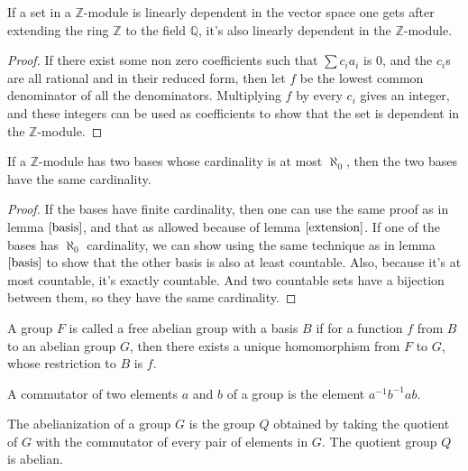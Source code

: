 \begin{lem}\label{extension}
If a set in a $\mathbb{Z}$-module is linearly dependent in the vector space one gets after extending the ring $\mathbb{Z}$ to the field $\mathbb{Q}$, it's also linearly dependent in the $\mathbb{Z}$-module.
\end{lem}

\begin{proof}
If there exist some non zero coefficients such that $\sum c_ia_i$ is $0$, and the $c_i$s are all rational and in their reduced form, then let $f$ be the lowest common denominator of all the denominators. Multiplying $f$ by every $c_i$ gives an integer, and these integers can be used as coefficients to show that the set is dependent in the $\mathbb{Z}$-module.
\end{proof}

\begin{lem}
If a $\mathbb{Z}$-module has two bases whose cardinality is at most $\aleph_0$, then the two bases have the same cardinality.
\end{lem}

\begin{proof}
If the bases have finite cardinality, then one can use the same proof as in lemma $\autoref{basis}$, and that as allowed because of lemma $\autoref{extension}$. If one of the bases has $\aleph_0$ cardinality, we can show using the same technique as in lemma $\autoref{basis}$ to show that the other basis is also at least countable. Also, because it's at most countable, it's exactly countable. And two countable sets have a bijection between them, so they have the same cardinality.
\end{proof}

\begin{defn}
A group $F$ is called a free abelian group with a basis $B$ if for a function $f$ from $B$ to an abelian group $G$, then there exists a unique homomorphism from $F$ to $G$, whose restriction to $B$ is $f$.
\end{defn}

\begin{defn}
A commutator of two elements $a$ and $b$ of a group is the element $a^{-1}b^{-1}ab$.
\end{defn}

\begin{defn}
The abelianization of a group $G$ is the group $Q$ obtained by taking the quotient of $G$ with the commutator of every pair of elements in $G$. The quotient group $Q$ is abelian.
\end{defn}

